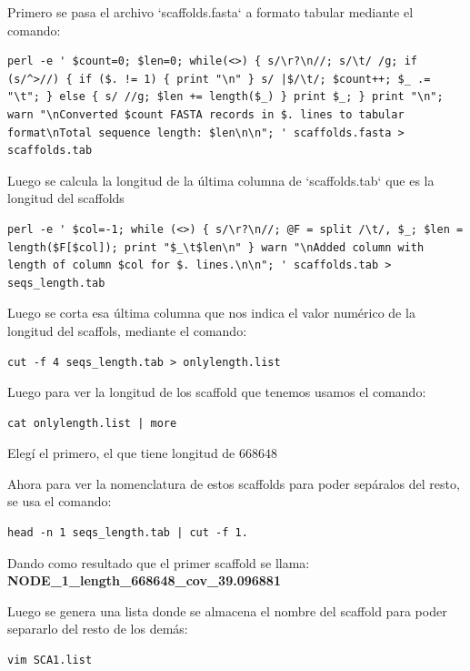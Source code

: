 \documentclass[journal, letterpaper, 11pt]{IEEEtran}
\begin{document}
Primero se pasa el archivo `scaffolds.fasta` a formato tabular mediante el comando:

\begin{lstlisting}[frame=single]
perl -e ' $count=0; $len=0; while(<>) { s/\r?\n//; s/\t/ /g; if (s/^>//) { if ($. != 1) { print "\n" } s/ |$/\t/; $count++; $_ .= "\t"; } else { s/ //g; $len += length($_) } print $_; } print "\n"; warn "\nConverted $count FASTA records in $. lines to tabular format\nTotal sequence length: $len\n\n"; ' scaffolds.fasta > scaffolds.tab
\end{lstlisting}

Luego se calcula la longitud de la última columna de `scaffolds.tab` que es la longitud del scaffolds

\begin{lstlisting}[frame=single]
perl -e ' $col=-1; while (<>) { s/\r?\n//; @F = split /\t/, $_; $len = length($F[$col]); print "$_\t$len\n" } warn "\nAdded column with length of column $col for $. lines.\n\n"; ' scaffolds.tab > seqs_length.tab 
\end{lstlisting}

Luego se corta esa última columna que nos indica el valor numérico de la longitud del scaffols, mediante el comando:

\begin{lstlisting}[frame=single]
cut -f 4 seqs_length.tab > onlylength.list
\end{lstlisting}

Luego para ver la longitud de los scaffold que tenemos usamos el comando:


\begin{lstlisting}[frame=single]
cat onlylength.list | more
\end{lstlisting}

Elegí el primero, el que tiene longitud de $668648$

Ahora para ver la nomenclatura de estos scaffolds para poder sepáralos del resto, se usa el comando:

\begin{lstlisting}[frame=single]
head -n 1 seqs_length.tab | cut -f 1.
\end{lstlisting}

Dando como resultado que el primer scaffold se llama: \textbf{NODE\_1\_length\_668648\_cov\_39.096881}

Luego se genera una lista donde se almacena el nombre del scaffold para poder separarlo del resto de los demás:

\begin{lstlisting}[frame=single]
vim SCA1.list
\end{lstlisting}
\end{document}

